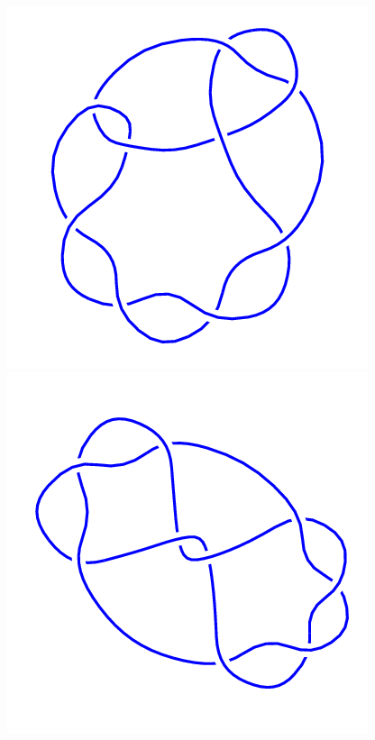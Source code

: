\begin{figure}[H]
\begin{minipage}[b]{.18\linewidth}
	\end{minipage}
	\begin{minipage}[b]{.18\linewidth}
		\centering
		\includegraphics[width=\linewidth]{../data/9_8.png}
	\end{minipage}
	\begin{minipage}[b]{.18\linewidth}
		\centering
		\includegraphics[width=\linewidth]{../data/9_9.png}

\end{minipage}
\end{figure}
